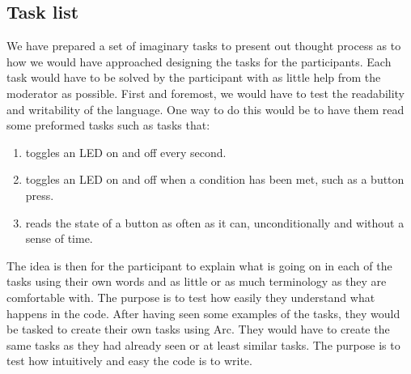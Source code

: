 
\subsection{Task list}\label{subsubsec:taskList}

We have prepared a set of imaginary tasks to present out thought process as to how we would have approached designing the tasks for the participants. Each task would have to be solved by the participant with as little help from the moderator as possible. First and foremost, we would have to test the readability and writability of the language. One way to do this would be to have them read some preformed tasks such as tasks that:

\begin{enumerate}
    \item toggles an LED on and off every second.
    \item toggles an LED on and off when a condition has been met, such as a button press.
    \item reads the state of a button as often as it can, unconditionally and without a sense of time.
\end{enumerate}

The idea is then for the participant to explain what is going on in each of the tasks using their own words and as little or as much terminology as they are comfortable with. The purpose is to test how easily they understand what happens in the code. After having seen some examples of the tasks, they would be tasked to create their own tasks using Arc. They would have to create the same tasks as they had already seen or at least similar tasks. The purpose is to test how intuitively and easy the code is to write.


